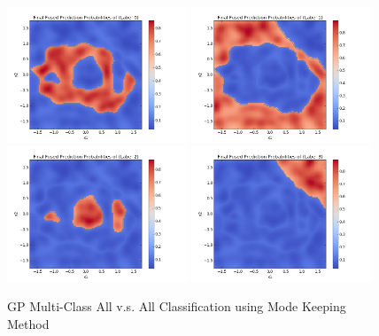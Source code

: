 				\begin{figure}[!htbp]
					\centering
						\includegraphics[width=0.48\textwidth]{Figures/Progress/modekeepingAVA/Figure5.png}
						\includegraphics[width=0.48\textwidth]{Figures/Progress/modekeepingAVA/Figure6.png}
						\includegraphics[width=0.48\textwidth]{Figures/Progress/modekeepingAVA/Figure7.png}
						\includegraphics[width=0.48\textwidth]{Figures/Progress/modekeepingAVA/Figure8.png}
					\caption{GP Multi-Class All v.s. All Classification using Mode Keeping Method}
					\label{ProgressReport:GaussianProcessModels:Figure:modekeepingAVA2}
				\end{figure}
				
